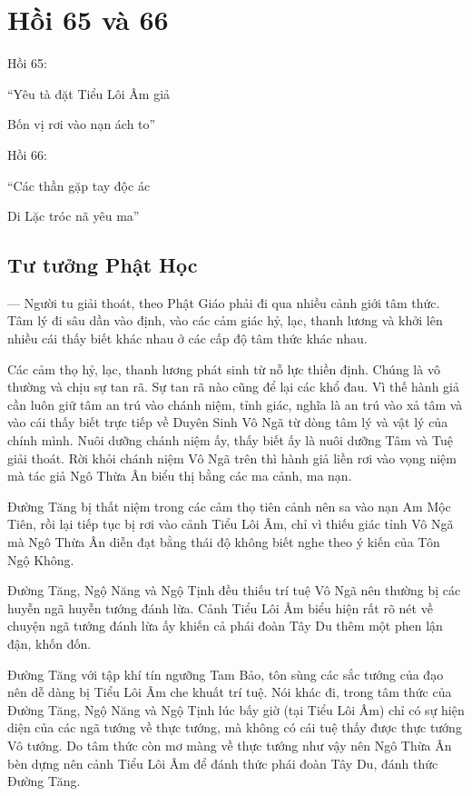 \chapter{Hồi 65 và 66} %
\label{cha:hoi_65_66}

Hồi 65:

\begin{itshape}
``Yêu tà đặt Tiểu Lôi Âm giả

Bốn vị rơi vào nạn ách to''
\end{itshape}

Hồi 66:

\begin{itshape}
``Các thần gặp tay độc ác

Di Lặc tróc nã yêu ma''
\end{itshape}

\section{Tư tưởng Phật Học} %
\label{sec:65_66_phat_hoc}

— Người tu giải thoát, theo Phật Giáo phải đi qua nhiều cảnh giới tâm thức. Tâm lý đi sâu dần vào định, vào các cảm giác hỷ, lạc, thanh lương và khởi lên nhiều cái thấy biết khác nhau ở các cấp độ tâm thức khác nhau.

Các cảm thọ hỷ, lạc, thanh lương phát sinh từ nỗ lực thiền định. Chúng là vô thường và chịu sự tan rã. Sự tan rã nào cũng để lại các khổ đau. Vì thế hành giả cần luôn giữ tâm an trú vào chánh niệm, tỉnh giác, nghĩa là an trú vào xả tâm và vào cái thấy biết trực tiếp về Duyên Sinh Vô Ngã từ dòng tâm lý và vật lý của chính mình. Nuôi dưỡng chánh niệm ấy, thấy biết ấy là nuôi dưỡng Tâm và Tuệ giải thoát. Rời khỏi chánh niệm Vô Ngã trên thì hành giả liền rơi vào vọng niệm mà tác giả Ngô Thừa Ân biểu thị bằng các ma cảnh, ma nạn.

Đường Tăng bị thất niệm trong các cảm thọ tiên cảnh nên sa vào nạn Am Mộc Tiên, rồi lại tiếp tục bị rơi vào cảnh Tiểu Lôi Âm, chỉ vì thiếu giác tỉnh Vô Ngã mà Ngô Thừa Ân diễn đạt bằng thái độ không biết nghe theo ý kiến của Tôn Ngộ Không.

Đường Tăng, Ngộ Năng và Ngộ Tịnh đều thiếu trí tuệ Vô Ngã nên thường bị các huyễn ngã huyễn tướng đánh lừa. Cảnh Tiểu Lôi Âm biểu hiện rất rõ nét về chuyện ngã tướng đánh lừa ấy khiến cả phái đoàn Tây Du thêm một phen lận đận, khốn đốn.

Đường Tăng với tập khí tín ngưỡng Tam Bảo, tôn sùng các sắc tướng của đạo nên dễ dàng bị Tiểu Lôi Âm che khuất trí tuệ. Nói khác đi, trong tâm thức của Đường Tăng, Ngộ Năng và Ngộ Tịnh lúc bấy giờ (tại Tiểu Lôi Âm) chỉ có sự hiện diện của các ngã tướng về thực tướng, mà không có cái tuệ thấy được thực tướng Vô tướng. Do tâm thức còn mơ màng về thực tướng như vậy nên Ngô Thừa Ân bèn dựng nên cảnh Tiểu Lôi Âm để đánh thức phái đoàn Tây Du, đánh thức Đường Tăng.

